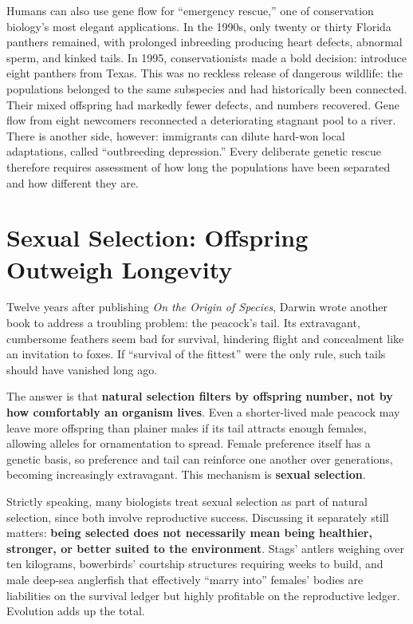 Humans can also use gene flow for ``emergency rescue,'' one of conservation biology's most elegant applications. In the 1990s, only twenty or thirty Florida panthers remained, with prolonged inbreeding producing heart defects, abnormal sperm, and kinked tails. In 1995, conservationists made a bold decision: introduce eight panthers from Texas. This was no reckless release of dangerous wildlife: the populations belonged to the same subspecies and had historically been connected. Their mixed offspring had markedly fewer defects, and numbers recovered. Gene flow from eight newcomers reconnected a deteriorating stagnant pool to a river. There is another side, however: immigrants can dilute hard-won local adaptations, called ``outbreeding depression.'' Every deliberate genetic rescue therefore requires assessment of how long the populations have been separated and how different they are.

\section{Sexual Selection: Offspring Outweigh Longevity}

Twelve years after publishing \emph{On the Origin of Species}, Darwin wrote another book to address a troubling problem: the peacock's tail. Its extravagant, cumbersome feathers seem bad for survival, hindering flight and concealment like an invitation to foxes. If ``survival of the fittest'' were the only rule, such tails should have vanished long ago.

The answer is that \textbf{natural selection filters by offspring number, not by how comfortably an organism lives}. Even a shorter-lived male peacock may leave more offspring than plainer males if its tail attracts enough females, allowing alleles for ornamentation to spread. Female preference itself has a genetic basis, so preference and tail can reinforce one another over generations, becoming increasingly extravagant. This mechanism is \textbf{sexual selection}.

Strictly speaking, many biologists treat sexual selection as part of natural selection, since both involve reproductive success. Discussing it separately still matters: \textbf{being selected does not necessarily mean being healthier, stronger, or better suited to the environment}. Stags' antlers weighing over ten kilograms, bowerbirds' courtship structures requiring weeks to build, and male deep-sea anglerfish that effectively ``marry into'' females' bodies are liabilities on the survival ledger but highly profitable on the reproductive ledger. Evolution adds up the total.

